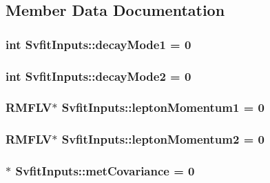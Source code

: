 \subsection{Member Data Documentation}
\hypertarget{classSvfitInputs_a784625a886909f4f9743c72f9780ccc5}{
\subsubsection[{decayMode1}]{\setlength{\rightskip}{0pt plus 5cm}int {\bf SvfitInputs::decayMode1} = 0}}
\label{classSvfitInputs_a784625a886909f4f9743c72f9780ccc5}
\hypertarget{classSvfitInputs_a667f1b15f6955a9a40929e9f670eabea}{
\subsubsection[{decayMode2}]{\setlength{\rightskip}{0pt plus 5cm}int {\bf SvfitInputs::decayMode2} = 0}}
\label{classSvfitInputs_a667f1b15f6955a9a40929e9f670eabea}
\hypertarget{classSvfitInputs_a8cbce6801e4e0ed5a0a376ab13e04697}{
\subsubsection[{leptonMomentum1}]{\setlength{\rightskip}{0pt plus 5cm}RMFLV$\ast$ {\bf SvfitInputs::leptonMomentum1} = 0}}
\label{classSvfitInputs_a8cbce6801e4e0ed5a0a376ab13e04697}
\hypertarget{classSvfitInputs_a16b08513227e966888b217e115b1f3e9}{
\subsubsection[{leptonMomentum2}]{\setlength{\rightskip}{0pt plus 5cm}RMFLV$\ast$ {\bf SvfitInputs::leptonMomentum2} = 0}}
\label{classSvfitInputs_a16b08513227e966888b217e115b1f3e9}
\hypertarget{classSvfitInputs_ae09cccb51b5186fd72eb03eae338f131}{
\subsubsection[{metCovariance}]{$\ast$ {\bf SvfitInputs::metCovariance} = 0}}
